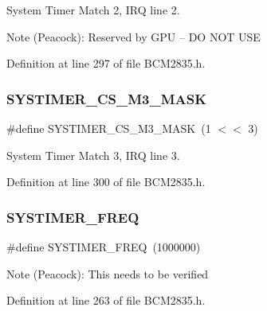 System Timer Match 2, I\+RQ line 2. 

\begin{DoxyNote}{Note}
(Peacock)\+: Reserved by G\+PU -- DO N\+OT U\+SE 
\end{DoxyNote}


Definition at line 297 of file B\+C\+M2835.\+h.

\mbox{\label{group__SYSTIMER_gaa925270b7e407cdf21f76e3bc5aee07f}} 
\subsubsection{\texorpdfstring{S\+Y\+S\+T\+I\+M\+E\+R\+\_\+\+C\+S\+\_\+\+M3\+\_\+\+M\+A\+SK}{SYSTIMER\_CS\_M3\_MASK}}
{\footnotesize\ttfamily \#define S\+Y\+S\+T\+I\+M\+E\+R\+\_\+\+C\+S\+\_\+\+M3\+\_\+\+M\+A\+SK~(1 $<$$<$ 3)}



System Timer Match 3, I\+RQ line 3. 



Definition at line 300 of file B\+C\+M2835.\+h.

\mbox{\label{group__SYSTIMER_gafeebbd2589412bdf2a7adc37273c8701}} 
\subsubsection{\texorpdfstring{S\+Y\+S\+T\+I\+M\+E\+R\+\_\+\+F\+R\+EQ}{SYSTIMER\_FREQ}}
{\footnotesize\ttfamily \#define S\+Y\+S\+T\+I\+M\+E\+R\+\_\+\+F\+R\+EQ~(1000000)}

\begin{DoxyNote}{Note}
(Peacock)\+: This needs to be verified 
\end{DoxyNote}


Definition at line 263 of file B\+C\+M2835.\+h.

